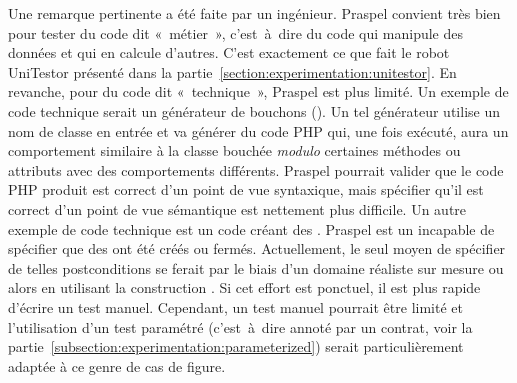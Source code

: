 Une remarque pertinente a été faite par un ingénieur. Praspel convient très bien
pour tester du code dit «~métier~», c'est~à~dire du code qui manipule des
données et qui en calcule d'autres. C'est exactement ce que fait le robot
UniTestor présenté dans la partie~\ref{section:experimentation:unitestor}. En
revanche, pour du code dit «~technique~», Praspel est plus limité. Un exemple de
code technique serait un générateur de bouchons (). Un
tel générateur utilise un nom de classe en entrée et va générer du code PHP qui,
une fois exécuté, aura un comportement similaire à la classe bouchée {\em
modulo} certaines méthodes ou attributs avec des comportements différents.
Praspel pourrait valider que le code PHP produit est correct d'un point de vue
syntaxique, mais spécifier qu'il est correct d'un point de vue sémantique est
nettement plus difficile. Un autre exemple de code technique est un code créant
des . Praspel est un incapable de spécifier que des
 ont été créés ou fermés. Actuellement, le seul moyen de
spécifier de telles postconditions se ferait par le biais d'un domaine réaliste
sur mesure ou alors en utilisant la construction \apred{\empty}. Si cet effort
est ponctuel, il est plus rapide d'écrire un test manuel. Cependant, un test
manuel pourrait être limité et l'utilisation d'un test paramétré (c'est~à~dire
annoté par un contrat, voir la
partie~\ref{subsection:experimentation:parameterized}) serait particulièrement
adaptée à ce genre de cas de figure.
